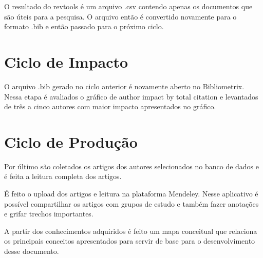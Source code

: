 O resultado do revtools é um arquivo .csv contendo apenas os documentos que são úteis para a pesquisa. O arquivo então é convertido novamente para o formato .bib e então passado para o próximo ciclo.

\section{Ciclo de Impacto}
O arquivo .bib gerado no ciclo anterior é novamente aberto no Bibliometrix. Nessa etapa é avaliados o gráfico de author impact by total citation e levantados de três a cinco autores com maior impacto apresentados no gráfico.

\section{Ciclo de Produção}
Por último são coletados os artigos dos autores selecionados no banco de dados e é feita a leitura completa dos artigos. 

É feito o upload dos artigos e leitura na plataforma Mendeley. Nesse aplicativo é possível compartilhar os artigos com grupos de estudo e também fazer anotações e grifar trechos importantes. 

A partir dos conhecimentos adquiridos é feito um mapa conceitual que relaciona os principais conceitos apresentados para servir de base para o desenvolvimento desse documento.







